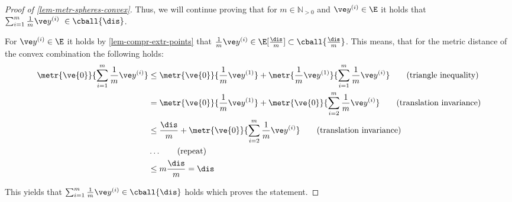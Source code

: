 \begin{proof}[Proof of \cref{lem-metr-spheres-convex}]


	Thus, we will continue proving that for $m \in \mathbb{N}_{>0}$ and $\yy \in \E$ it holds that $\sum_{i=1}^{m} \frac{1}{m} \yy ~ \in \cball{\dis}$.

	For $\yy \in \E$ it holds by \cref{lem-compr-extr-points} that $\frac{1}{m}\yy \in \E[\frac{\dis}{m}] \subset \cball{\frac{\dis}{m}}$.
	This means, that for the metric distance of the convex combination the following holds:
	\begin{align*}
    \metr{\ve{0}}{\sum_{i=1}^{m} \frac{1}{m} \yy} & \leq \metr{\ve{0}}{\frac{1}{m}\yy[1]} + \metr{\frac{1}{m} \yy[1]}{\sum_{i=1}^{m} \frac{1}{m}\yy} \tag{triangle inequality} \\
		                                         & = \metr{\ve{0}}{\frac{1}{m}\yy[1]} + \metr{\ve{0}}{\sum_{i=2}^{m} \frac{1}{m}\yy} \tag{translation invariance}           \\
		                                         & \leq \frac{\dis}{m} + \metr{\ve{0}}{\sum_{i=2}^{m} \frac{1}{m}\yy} \tag{translation invariance}                   \\
		                                         & \dots \tag{repeat}                                                                                             \\
		                                         & \leq m \frac{\dis}{m} = \dis
	\end{align*}

	This yields that $\sum_{i=1}^{m} \frac{1}{m}\yy \in \cball{\dis}$ holds which proves the statement.
\end{proof}

